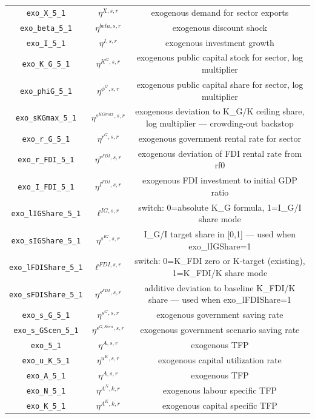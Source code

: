 \begin{center}
\begin{longtable}{ccc}
\texttt{exo\_X\_5\_1} & ${\eta^{X,s,r}}$ & exogenous demand for sector exports\\
\texttt{exo\_beta\_5\_1} & ${\eta^{beta,s,r}}$ & exogenous discount shock\\
\texttt{exo\_I\_5\_1} & ${\eta^{I,s,r}}$ & exogenous investment growth\\
\texttt{exo\_K\_G\_5\_1} & ${\eta^{K^G,s,r}}$ & exogenous public capital stock for sector, log multiplier\\
\texttt{exo\_phiG\_5\_1} & ${\eta^{\phi^{G},s,r}}$ & exogenous public capital share for sector, log multiplier\\
\texttt{exo\_sKGmax\_5\_1} & ${\eta^{s^{KGmax},s,r}}$ & exogenous deviation to K\_G/K ceiling share, log multiplier — crowding-out backstop\\
\texttt{exo\_r\_G\_5\_1} & ${\eta^{r^G,s,r}}$ & exogenous government rental rate for sector\\
\texttt{exo\_r\_FDI\_5\_1} & ${\eta^{r^{FDI},s,r}}$ & exogenous deviation of FDI rental rate from rf0\\
\texttt{exo\_I\_FDI\_5\_1} & ${\eta^{I^{FDI},s,r}}$ & exogenous FDI investment to initial GDP ratio\\
\texttt{exo\_lIGShare\_5\_1} & ${\ell^{IG,s,r}}$ & switch: 0=absolute K\_G formula, 1=I\_G/I share mode\\
\texttt{exo\_sIGShare\_5\_1} & ${\eta^{s^{IG},s,r}}$ & I\_G/I target share in [0,1] — used when exo\_lIGShare=1\\
\texttt{exo\_lFDIShare\_5\_1} & ${\ell^{FDI,s,r}}$ & switch: 0=K\_FDI zero or K-target (existing), 1=K\_FDI/K share mode\\
\texttt{exo\_sFDIShare\_5\_1} & ${\eta^{s^{FDI},s,r}}$ & additive deviation to baseline K\_FDI/K share — used when exo\_lFDIShare=1\\
\texttt{exo\_s\_G\_5\_1} & ${\eta^{s^G,s,r}}$ & exogenous government saving rate\\
\texttt{exo\_s\_GScen\_5\_1} & ${\eta^{s^{G,Scen},s,r}}$ & exogenous government scenario saving rate\\
\texttt{exo\_5\_1} & ${\eta^{A,s,r}}$ & exogenous TFP\\
\texttt{exo\_u\_K\_5\_1} & ${\eta^{u^K,s,r}}$ & exogenous capital utilization rate\\
\texttt{exo\_A\_5\_1} & ${\eta^{A,s,r}}$ & exogenous TFP\\
\texttt{exo\_N\_5\_1} & ${\eta^{A^{N},k,r}}$ & exogenous labour specific TFP\\
\texttt{exo\_K\_5\_1} & ${\eta^{A^{K},k,r}}$ & exogenous capital specific TFP\\

\end{longtable}
\end{center}
